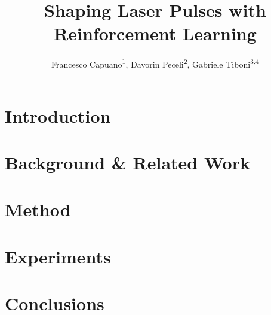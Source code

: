 \documentclass[10pt,table]{article}
\title{Shaping Laser Pulses with Reinforcement Learning}
\author{
Francesco Capuano\textsuperscript{1},
Davorin Peceli\textsuperscript{2},
Gabriele Tiboni\textsuperscript{3,4}
}
\begin{document}
\makeCover  %
\maketitle  %

\begin{abstract}

\end{abstract}

\section{Introduction}
\label{sec:introduction}


\section{Background \& Related Work}
\label{sec:background}


\section{Method}
\label{sec:method}


\section{Experiments}
\label{sec:experiments}


\section{Conclusions}
\label{sec:discussion}




% 


\end{document}
